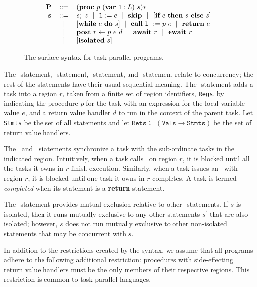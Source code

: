 \begin{figure}
  \begin{center}
\[
  \begin{array}{rcl}
\textbf{P} &::=& (\textbf{proc}~p~(\textbf{var}\ \texttt{l} : L)~s)* \\
\textbf{s} &::=& s;~s ~~|~~ \texttt{l} := e ~~|~~ \textbf{skip} ~~|~~ [ \textbf{if}~e~\textbf{then}~s~\textbf{else}~s ] \\
&~~|~~& [ \textbf{while}~e~\textbf{do}~s ] ~~|~~ \textbf{call}~\texttt{l}\ := p~e ~~|~~ \textbf{return}~e \\
&~~|~~& \mathbf{post}~r \leftarrow p~e~d ~~|~~ \mathbf{await}~r ~~|~~ \mathbf{ewait}~r \\
&~~|~~& [ \mathbf{isolated}~s ]
  \end{array}
\]
  \end{center}
  \caption{The surface syntax for task parallel programs.}
  \label{fig:syntax}
\end{figure}

The \post-statement, \await-statement, \ewait-statement, and
\isolated-statement relate to concurrency; the rest of the statements
have their usual sequential meaning.  The \post-statement adds a task
into a region $r$, taken from a finite set of region identifiers,
\texttt{Regs}, by indicating the procedure $p$ for the task with an
expression for the local variable value $e$, and a return value
handler $d$ to run in the context of the parent task.  Let
\texttt{Stmts} be the set of all statements and let $\texttt{Rets}
\subseteq (\texttt{Vals} \rightarrow \texttt{Stmts})$ be the set of
return value handlers.

The \await\ and \ewait\ statements synchronize a task with the
sub-ordinate tasks in the indicated region.  Intuitively, when a task
calls \await\ on region $r$, it is blocked until all the tasks it owns
in $r$ finish execution.  Similarly, when a task issues an
\ewait\ with region $r$, it is blocked until one task it owns in $r$
completes.  A task is termed \emph{completed} when its statement is a
\textbf{return}-statement.

The \isolated-statement provides mutual exclusion relative to other
\isolated-statements.  If $s$ is isolated, then it runs mutually
exclusive to any other statements $s^\prime$ that are also isolated;
however, $s$ does not run mutually exclusive to other non-isolated
statements that may be concurrent with $s$.

In addition to the restrictions created by the syntax, we assume that
all programs adhere to the following additional restriction:
procedures with side-effecting return value handlers must be the only
members of their respective regions. This restriction is common to
task-parallel languages.

